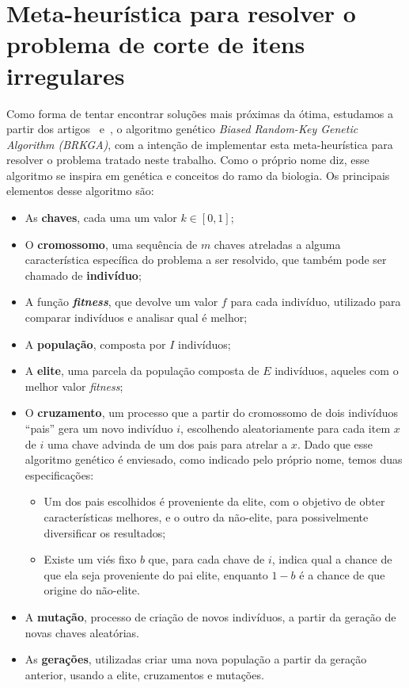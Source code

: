 \documentclass[12pt, openright, twoside, a4paper, english, brazilian]{USPSC-classe/USPSC}
\begin{document}
\section{Meta-heurística para resolver o problema de corte de itens irregulares} \label{sec:BRKGA}

Como forma de tentar encontrar soluções mais próximas da ótima, estudamos a partir dos artigos~\cite{key} e~\cite{containers}, o algoritmo genético {\it Biased Random-Key Genetic Algorithm (BRKGA)}, com a intenção de implementar esta meta-heurística para resolver o problema tratado neste trabalho. Como o próprio nome diz, esse algoritmo se inspira em genética e conceitos do ramo da biologia. %
Os principais elementos desse algoritmo são:
\begin{itemize}
    \item As {\bf chaves}, cada uma um valor $k \in [0,1]$;
    \item O {\bf cromossomo}, uma sequência de $m$ chaves atreladas a alguma característica específica do problema a ser resolvido, que também pode ser chamado de {\bf indivíduo};
    \item A função \textbf {\textit {fitness}}, que devolve um valor $f$ para cada indivíduo, utilizado para comparar indivíduos e analisar qual é melhor;
    \item A {\bf população}, composta por $I$ indivíduos;
    \item A {\bf elite}, uma parcela da população composta de $E$ indivíduos, aqueles com o melhor valor {\it fitness};
    \item O {\bf cruzamento}, um processo que a partir do cromossomo de dois indivíduos ``pais'' gera um novo indivíduo $i$, escolhendo aleatoriamente para cada item $x$ de $i$ uma chave advinda de um dos pais para atrelar a $x$. Dado que esse algoritmo genético é enviesado, como indicado pelo próprio nome, temos duas especificações:
    \begin{itemize}
        \item Um dos pais escolhidos é proveniente da elite, com o objetivo de obter características melhores, e o outro da não-elite, para possivelmente diversificar os resultados;
        \item Existe um viés fixo $b$ que, para cada chave de $i$, indica qual a chance de que ela seja proveniente do pai elite, enquanto $1-b$ é a chance de que origine do não-elite.
    \end{itemize}
    \item A {\bf mutação}, processo de criação de novos indivíduos, a partir da geração de novas chaves aleatórias.
    \item As {\bf gerações}, utilizadas criar uma nova população a partir da geração anterior, usando a elite, cruzamentos e mutações. 
\end{itemize}
\end{document}
